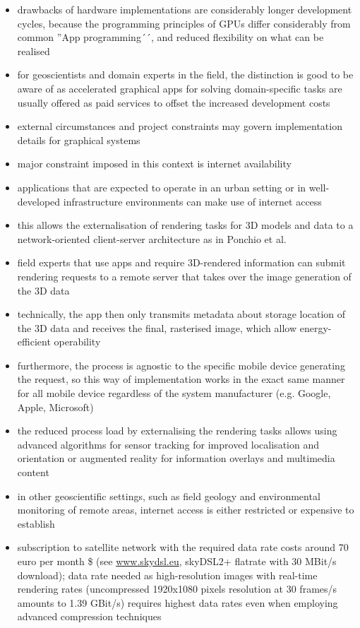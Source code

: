 \documentclass[review]{elsarticle}
\begin{document}
\begin{itemize}
\item drawbacks of hardware implementations are considerably longer development cycles, because the programming principles of GPUs differ considerably from common ''App programming´´, and reduced flexibility on what can be realised
\item for geoscientists and domain experts in the field, the distinction is good to be aware of as accelerated graphical apps for solving domain-specific tasks are usually offered as paid services to offset the increased development costs
\item external circumstances and project constraints may govern implementation details for graphical systems
\item major constraint imposed in this context is internet availability
\item applications that are expected to operate in an urban setting or in well-developed infrastructure environments can make use of internet access
\item this allows the externalisation of rendering tasks for 3D models and data to a network-oriented client-server architecture as in Ponchio et al. \cite{Ponchio2016}
\item field experts that use apps and require 3D-rendered information can submit rendering requests to a remote server that takes over the image generation of the 3D data
\item technically, the app then only transmits metadata about storage location of the 3D data and receives the final, rasterised image, which allow energy-efficient operability 
\item furthermore, the process is agnostic to the specific mobile device generating the request, so this way of implementation works in the exact same manner for all mobile device regardless of the system manufacturer (e.g. Google, Apple, Microsoft)
\item the reduced process load by externalising the rendering tasks allows using advanced algorithms for sensor tracking \cite{} for improved localisation and orientation or augmented reality \cite{} for information overlays and multimedia content
\item in other geoscientific settings, such as field geology \cite{} and environmental monitoring \cite{} of remote areas, internet access is either restricted or expensive to establish
\item subscription to satellite network with the required data rate costs around 70 euro per month \$ (see \url{www.skydsl.eu}, skyDSL2+ flatrate with 30 MBit/s download); data rate needed as high-resolution images with real-time rendering rates (uncompressed 1920x1080 pixels resolution at 30 frames/s amounts to 1.39 GBit/s) requires highest data rates even when employing advanced compression techniques

\end{itemize}
\end{document}
